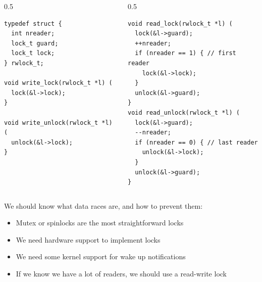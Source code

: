   \begin{slide}


    \begin{columns}
      \begin{column}{0.5\textwidth}
        \begin{verbatim}
typedef struct {
  int nreader;
  lock_t guard;
  lock_t lock;
} rwlock_t;

void write_lock(rwlock_t *l) (
  lock(&l->lock);
}

void write_unlock(rwlock_t *l) (
  unlock(&l->lock);
}
        \end{verbatim}
      \end{column}
      \begin{column}{0.5\textwidth}
        \begin{verbatim}
void read_lock(rwlock_t *l) (
  lock(&l->guard);
  ++nreader;
  if (nreader == 1) { // first reader
    lock(&l->lock);
  }
  unlock(&l->guard);
}
void read_unlock(rwlock_t *l) (
  lock(&l->guard);
  --nreader;
  if (nreader == 0) { // last reader
    unlock(&l->lock);
  }
  unlock(&l->guard);
}
        \end{verbatim}
      \end{column}
    \end{columns}

  \end{slide}

  \begin{slide}

    We should know what data races are, and how to prevent them:
    \begin{itemize}
      \item Mutex or spinlocks are the most straightforward locks
      \item We need hardware support to implement locks
      \item We need some kernel support for wake up notifications
      \item If we know we have a lot of readers, we should use a read-write lock
    \end{itemize}
  \end{slide}
  

